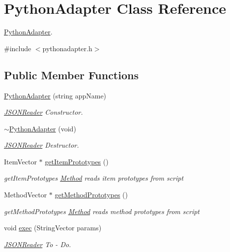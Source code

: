 \hypertarget{class_python_adapter}{\section{\-Python\-Adapter \-Class \-Reference}
\label{class_python_adapter}
}


\hyperlink{class_python_adapter}{\-Python\-Adapter}.  




{\ttfamily \#include $<$pythonadapter.\-h$>$}

\subsection*{\-Public \-Member \-Functions}
\begin{DoxyCompactItemize}
\item 
\hyperlink{class_python_adapter_a79c4bd84f6551088078d18cb4c07c8bd}{\-Python\-Adapter} (string app\-Name)
\begin{DoxyCompactList}\small\item\em \hyperlink{class_j_s_o_n_reader}{\-J\-S\-O\-N\-Reader} \-Constructor. \end{DoxyCompactList}\item 
\hypertarget{class_python_adapter_aeb53a22638b6962086ead892443be597}{\hyperlink{class_python_adapter_aeb53a22638b6962086ead892443be597}{$\sim$\-Python\-Adapter} (void)}\label{class_python_adapter_aeb53a22638b6962086ead892443be597}

\begin{DoxyCompactList}\small\item\em \hyperlink{class_j_s_o_n_reader}{\-J\-S\-O\-N\-Reader} \-Destructor. \end{DoxyCompactList}\item 
\-Item\-Vector $\ast$ \hyperlink{class_python_adapter_aed59523057b47df5a02ca0efce5598cb}{get\-Item\-Prototypes} ()
\begin{DoxyCompactList}\small\item\em get\-Item\-Prototypes \hyperlink{class_method}{\-Method} reads item prototypes from script \end{DoxyCompactList}\item 
\-Method\-Vector $\ast$ \hyperlink{class_python_adapter_aa6fc0691bed410879f2f7de0be8d0110}{get\-Method\-Prototypes} ()
\begin{DoxyCompactList}\small\item\em get\-Method\-Prototypes \hyperlink{class_method}{\-Method} reads method prototypes from script \end{DoxyCompactList}\item 
void \hyperlink{class_python_adapter_a0e288dbd1e4b378f6f73d093e41c832e}{exec} (\-String\-Vector params)
\begin{DoxyCompactList}\small\item\em \hyperlink{class_j_s_o_n_reader}{\-J\-S\-O\-N\-Reader} \-To -\/ \-Do. \end{DoxyCompactList}\end{DoxyCompactItemize}


